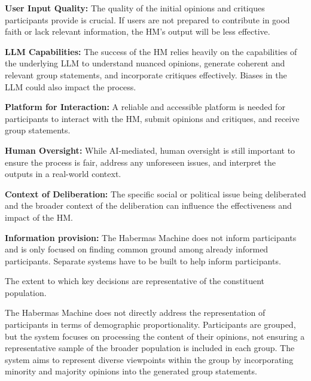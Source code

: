     \begin{noitemize}
        \item \textbf{User Input Quality:} The quality of the initial opinions and critiques participants provide is crucial. If users are not prepared to contribute in good faith or lack relevant information, the HM's output will be less effective.  
        \item \textbf{LLM Capabilities:} The success of the HM relies heavily on the capabilities of the underlying LLM to understand nuanced opinions, generate coherent and relevant group statements, and incorporate critiques effectively.  Biases in the LLM could also impact the process.  
        \item \textbf{Platform for Interaction:}  A reliable and accessible platform is needed for participants to interact with the HM, submit opinions and critiques, and receive group statements.  
        \item \textbf{Human Oversight:} While AI-mediated, human oversight is still important to ensure the process is fair, address any unforeseen issues, and interpret the outputs in a real-world context.  
        \item \textbf{Context of Deliberation:} The specific social or political issue being deliberated and the broader context of the deliberation can influence the effectiveness and impact of the HM.  
        \item \textbf{Information provision:} The Habermas Machine does not inform participants and is only focused on finding common ground among already informed participants. Separate systems have to be built to help inform participants.
    \end{noitemize}
    

    \begin{describe}[grey]
        The extent to which key decisions are representative of the constituent population.
    \end{describe}

    The Habermas Machine does not directly address the representation of participants in terms of demographic proportionality. Participants are grouped, but the system focuses on processing the content of their opinions, not ensuring a representative sample of the broader population is included in each group. The system aims to represent diverse viewpoints within the group by incorporating minority and majority opinions into the generated group statements.

